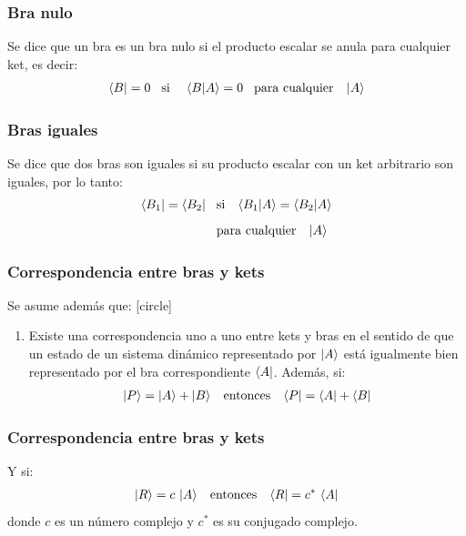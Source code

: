 \documentclass[12pt]{beamer}
\begin{document}
\begin{frame}
\frametitle{Bra nulo}
Se dice que un bra es un bra nulo si el producto escalar se anula para cualquier ket, es decir:
\pause
\begin{align*}
\bra{B} = 0 \hspace{0.3cm} \mbox{si} \hspace{0.4cm} \braket{B}{A} = 0 \hspace{0.3cm} \mbox{para cualquier} \hspace{0.3cm} \ket{A}
\end{align*}
\end{frame}
\begin{frame}
\frametitle{Bras iguales}
Se dice que dos bras son iguales si su producto escalar con un ket arbitrario son iguales, por lo tanto:
\pause
\begin{align*}
\bra{B_{1}} = \bra{B_{2}} \hspace{0.3cm} &\mbox{si} \hspace{0.3cm} \braket{B_{1}}{A} = \braket{B_{2}}{A} \\[0.5em]
&\mbox{para cualquier} \hspace{0.3cm} \ket{A}
\end{align*}
\end{frame}
\begin{frame}
\frametitle{Correspondencia entre bras y kets}
Se asume además que:
\pause
{}
[circle]
\begin{enumerate}[<+->]
\item Existe una correspondencia uno a uno entre kets y bras en el sentido de que un estado de un sistema dinámico representado por $\ket{A}$ está igualmente bien representado por el bra correspondiente $\bra{A}$. Además, si:
\pause
\begin{align*}
\ket{P} = \ket{A} + \ket{B} \hspace{0.3cm} \mbox{entonces} \hspace{0.3cm} \bra{P} = \bra{A} + \bra{B}
\end{align*}
\seti
\end{enumerate}
\end{frame}
\begin{frame}
\frametitle{Correspondencia entre bras y kets}
Y si:
\pause
\begin{align*}
\ket{R} = c \, \ket{A} \hspace{0.3cm} \mbox{entonces} \hspace{0.3cm} \bra{R} = c^{*} \, \bra{A}
\end{align*}
donde $c$ es un número complejo y $c^{*}$ es su conjugado complejo.
\end{frame}
\end{document}
